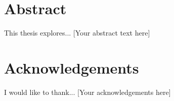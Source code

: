 \chapter*{Abstract}
This thesis explores... [Your abstract text here]

\chapter*{Acknowledgements}
I would like to thank... [Your acknowledgements here] 